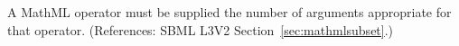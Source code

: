 A MathML operator must be supplied the number of arguments appropriate for
that operator.  (References: SBML L3V2 Section~\ref{sec:mathmlsubset}.)
